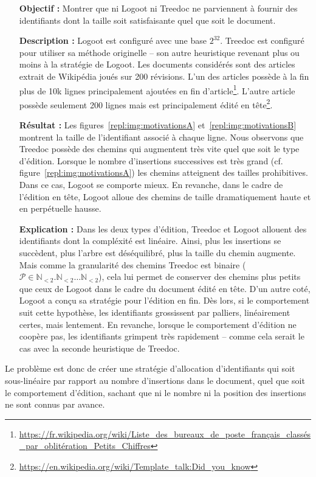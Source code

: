 \begin{itemize}
\item [\textbf{Objectif :}] Montrer que ni Logoot ni Treedoc ne parviennent à
  fournir des identifiants dont la taille soit satisfaisante quel que soit le
  document.
\item [\textbf{Description :}] Logoot est configuré avec une base
  $2^{32}$. Treedoc est configuré pour utiliser sa méthode originelle -- son
  autre heuristique revenant plus ou moins à la stratégie de Logoot. Les
  documents considérés sont des articles extrait de Wikipédia joués sur 200
  révisions. L'un des articles possède à la fin plus de 10k lignes
  principalement ajoutées en fin
  d'article\footnote{\url{https://fr.wikipedia.org/wiki/Liste_des_bureaux_de_poste_français_classés_par_oblitération_Petits_Chiffres}}. L'autre
  article possède seulement 200 lignes mais est principalement édité en
  tête\footnote{\url{https://en.wikipedia.org/wiki/Template_talk:Did_you_know}}.
\item [\textbf{Résultat :}] Les figures~\ref{repl:img:motivationsA}
  et~\ref{repl:img:motivationsB} montrent la taille de l'identifiant associé à
  chaque ligne. Nous observons que Treedoc possède des chemins qui augmentent
  très vite quel que soit le type d'édition. Lorsque le nombre d'insertions
  successives est très grand (cf. figure~\ref{repl:img:motivationsA}) les
  chemins atteignent des tailles prohibitives. Dans ce cas, Logoot se comporte
  mieux. En revanche, dans le cadre de l'édition en tête, Logoot alloue des
  chemins de taille dramatiquement haute et en perpétuelle hausse.
\item [\textbf{Explication :}] Dans les deux types d'édition, Treedoc et Logoot
  allouent des identifiants dont la compléxité est linéaire. Ainsi, plus les
  insertions se succèdent, plus l'arbre est déséquilibré, plus la taille du
  chemin augmente. Mais comme la granularité des chemins Treedoc est binaire
  ($\mathcal{P}\in \mathbb{N}_{<2}.\mathbb{N}_{<2}\ldots\mathbb{N}_{<2}$), cela
  lui permet de conserver des chemins plus petits que ceux de Logoot dans le
  cadre du document édité en tête. D'un autre coté, Logoot a conçu sa stratégie
  pour l'édition en fin. Dès lors, si le comportement suit cette hypothèse, les
  identifiants grossissent par palliers, linéairement certes, mais lentement. En
  revanche, lorsque le comportement d'édition ne coopère pas, les identifiants
  grimpent très rapidement -- comme cela serait le cas avec la seconde
  heuristique de Treedoc.
\end{itemize}

Le problème est donc de créer une stratégie d'allocation d'identifiants qui soit
sous-linéaire par rapport au nombre d'insertions dans le document, quel que soit
le comportement d'édition, sachant que ni le nombre ni la position des
insertions ne sont connus par avance. 

